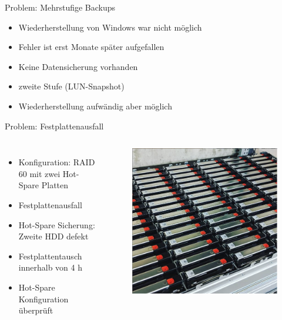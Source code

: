 \documentclass[10pt]{beamer}
\begin{document}
%
%
\begin{frame}[fragile]{Problem: Mehrstufige Backups}
	\begin{itemize}
	\item Wiederherstellung von Windows war nicht möglich
	\item Fehler ist erst Monate später aufgefallen
	\item Keine Datensicherung vorhanden
	\item zweite Stufe (LUN-Snapshot)
	\item Wiederherstellung aufwändig aber möglich
\end{itemize}
\end{frame}

%
%
\begin{frame}[fragile]{Problem: Festplattenausfall}
\begin{columns}[T,c,onlytextwidth]
	\begin{itemize}
		\item Konfiguration: RAID 60 mit zwei Hot-Spare Platten
		\item Festplattenausfall
		\item Hot-Spare Sicherung: Zweite HDD defekt
		\item Festplattentausch innerhalb von 4 h
		\item Hot-Spare Konfiguration überprüft
	\end{itemize}
	\begin{figure}
		\includegraphics[width=1\textwidth]{images/hdd}
	\end{figure}
\end{columns}
\end{frame}
\end{document}
